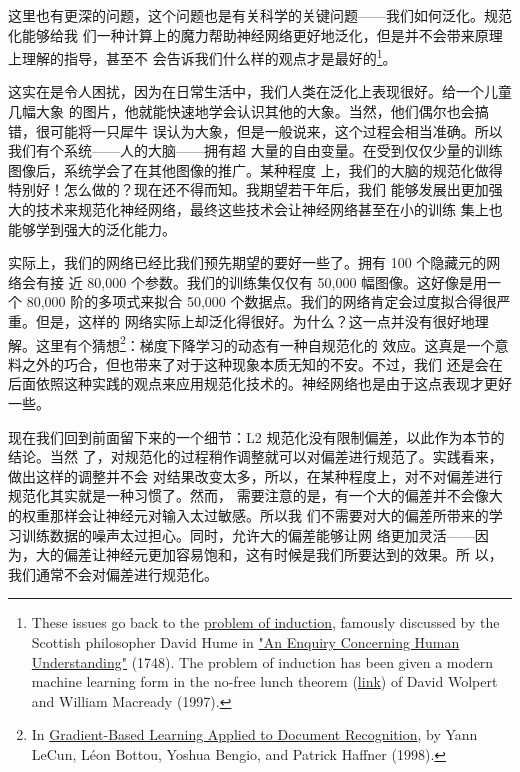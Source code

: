 这里也有更深的问题，这个问题也是有关科学的关键问题——我们如何泛化。规范化能够给我
们一种计算上的魔力帮助神经网络更好地泛化，但是并不会带来原理上理解的指导，甚至不
会告诉我们什么样的观点才是最好的\footnote{These issues go back to the
  \href{http://en.wikipedia.org/wiki/Problem_of_induction}{problem of
    induction}, famously discussed by the Scottish philosopher David Hume in
  \href{http://www.gutenberg.org/ebooks/9662}{"An Enquiry Concerning Human
    Understanding"} (1748). The problem of induction has been given a modern
  machine learning form in the no-free lunch theorem
  (\href{http://ieeexplore.ieee.org/xpl/articleDetails.jsp?tp=&arnumber=585893}{link})
  of David Wolpert and William Macready (1997).}。

这实在是令人困扰，因为在日常生活中，我们人类在泛化上表现很好。给一个儿童几幅大象
的图片，他就能快速地学会认识其他的大象。当然，他们偶尔也会搞错，很可能将一只犀牛
误认为大象，但是一般说来，这个过程会相当准确。所以我们有个系统——人的大脑——拥有超
大量的自由变量。在受到仅仅少量的训练图像后，系统学会了在其他图像的推广。某种程度
上，我们的大脑的规范化做得特别好！怎么做的？现在还不得而知。我期望若干年后，我们
能够发展出更加强大的技术来规范化神经网络，最终这些技术会让神经网络甚至在小的训练
集上也能够学到强大的泛化能力。

实际上，我们的网络已经比我们预先期望的要好一些了。拥有 100 个隐藏元的网络会有接
近 80,000 个参数。我们的训练集仅仅有 50,000 幅图像。这好像是用一个 80,000
阶的多项式来拟合 50,000 个数据点。我们的网络肯定会过度拟合得很严重。但是，这样的
网络实际上却泛化得很好。为什么？这一点并没有很好地理解。这里有个猜想\footnote{In
  \href{http://yann.lecun.com/exdb/publis/pdf/lecun-01a.pdf}{Gradient-Based
    Learning Applied to Document Recognition}, by Yann LeCun, Léon Bottou,
  Yoshua Bengio, and Patrick Haffner (1998).}：梯度下降学习的动态有一种自规范化的
效应。这真是一个意料之外的巧合，但也带来了对于这种现象本质无知的不安。不过，我们
还是会在后面依照这种实践的观点来应用规范化技术的。神经网络也是由于这点表现才更好
一些。

现在我们回到前面留下来的一个细节：L2 规范化没有限制偏差，以此作为本节的结论。当然
了，对规范化的过程稍作调整就可以对偏差进行规范了。实践看来，做出这样的调整并不会
对结果改变太多，所以，在某种程度上，对不对偏差进行规范化其实就是一种习惯了。然而，
需要注意的是，有一个大的偏差并不会像大的权重那样会让神经元对输入太过敏感。所以我
们不需要对大的偏差所带来的学习训练数据的噪声太过担心。同时，允许大的偏差能够让网
络更加灵活——因为，大的偏差让神经元更加容易饱和，这有时候是我们所要达到的效果。所
以，我们通常不会对偏差进行规范化。

